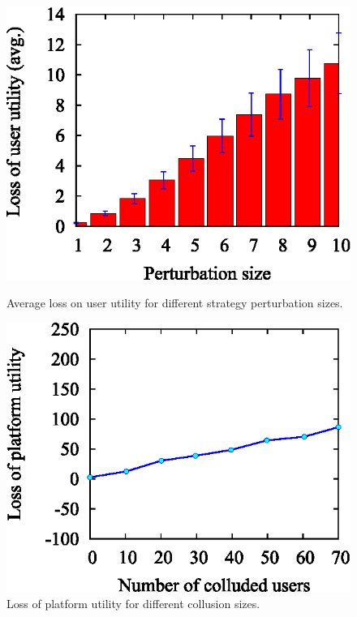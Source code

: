 \documentclass[conference]{IEEEtran}
\theoremstyle{definition}
\begin{document}
\begin{figure}[!t]
\centering
\begin{minipage}{0.3\textwidth}
\includegraphics[width=\textwidth]{collusion_resist_codes/images/img_tr_perturb_dis.eps}
\caption{Average loss on user utility for different strategy perturbation sizes.}
\label{fig:tr_perturb_dis}
\end{minipage}
\hspace{0.01cm}
\begin{minipage}{0.3\textwidth}
\includegraphics[width=\textwidth]{collusion_resist_codes/images/img_up_ratio_dis.eps}
\caption{Loss of platform utility for different collusion sizes.}

\end{minipage}
\end{figure}
\end{document}
